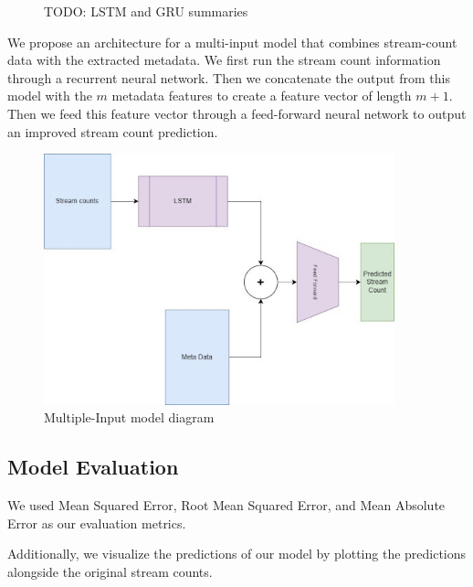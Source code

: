 \documentclass[11pt]{article}
\begin{document}
\begin{figure}
    \centering{}
    \caption{TODO: LSTM and GRU summaries}
\end{figure}

We propose an architecture for a multi-input model that combines stream-count data with the extracted metadata. We first run the stream count information through a recurrent neural network. Then we concatenate the output from this model with the $m$ metadata features to create a feature vector of length $m + 1$. Then we feed this feature vector through a feed-forward neural network to output an improved stream count prediction.

\begin{figure}
    \centering{}
    \includegraphics[width=4in]{figs/model_arch_sketch.jpg}
    \caption{Multiple-Input model diagram}
\end{figure}

\subsection{Model Evaluation}
We used Mean Squared Error, Root Mean Squared Error, and Mean Absolute Error as our evaluation metrics. 

Additionally, we visualize the predictions of our model by plotting the predictions alongside the original stream counts.
\end{document}
